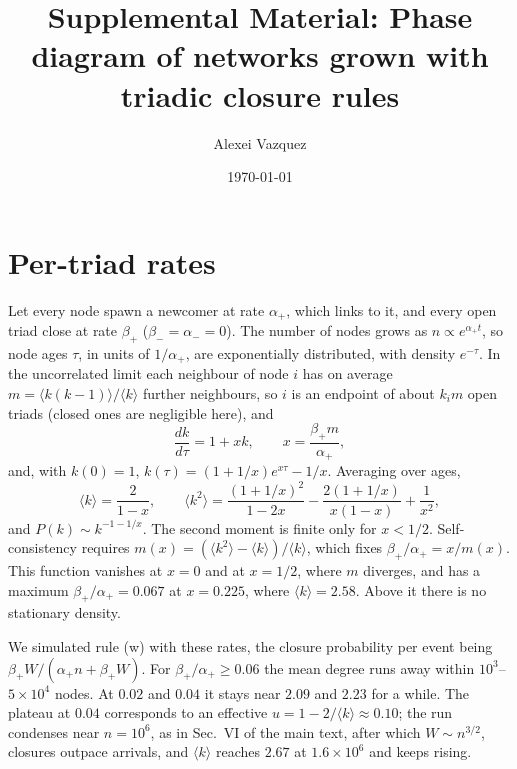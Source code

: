 \documentclass[aps,pre,twocolumn,superscriptaddress,floatfix,nofootinbib]{revtex4-2}
\begin{document}
\title{Supplemental Material: Phase diagram of networks grown with triadic closure rules}

\author{Alexei Vazquez}

\date{\today}

\maketitle

\section{Per-triad rates}

Let every node spawn a newcomer at rate $\alpha_+$, which links to it, and every
open triad close at rate $\beta_+$ ($\beta_-=\alpha_-=0$). The number of nodes
grows as $n\propto e^{\alpha_+t}$, so node ages $\tau$, in units of
$1/\alpha_+$, are exponentially distributed, with density $e^{-\tau}$. In the
uncorrelated limit each neighbour of node $i$ has on average
$m=\langle k(k-1)\rangle/\langle k\rangle$ further neighbours, so $i$ is an
endpoint of about $k_im$ open triads (closed ones are negligible here), and
\begin{equation}
  \frac{dk}{d\tau}=1+xk,\qquad x=\frac{\beta_+m}{\alpha_+},
\end{equation}
and, with $k(0)=1$, $k(\tau)=(1+1/x)e^{x\tau}-1/x$. Averaging over ages,
\begin{equation}
  \langle k\rangle=\frac{2}{1-x},\qquad
  \langle k^2\rangle=\frac{(1+1/x)^2}{1-2x}-\frac{2(1+1/x)}{x(1-x)}+\frac1{x^2},
\end{equation}
and $P(k)\sim k^{-1-1/x}$. The second moment is finite only for $x<1/2$.
Self-consistency requires $m(x)=(\langle k^2\rangle-\langle k\rangle)/\langle k\rangle$,
which fixes $\beta_+/\alpha_+=x/m(x)$. This function vanishes at $x=0$ and at
$x=1/2$, where $m$ diverges, and has a maximum $\beta_+/\alpha_+=0.067$ at
$x=0.225$, where $\langle k\rangle=2.58$. Above it there is no stationary
density.

We simulated rule (w) with these rates, the closure probability per event
being $\beta_+W/(\alpha_+n+\beta_+W)$. For $\beta_+/\alpha_+\ge0.06$ the mean
degree runs away within $10^3$--$5\times10^4$ nodes. At $0.02$ and $0.04$ it
stays near $2.09$ and $2.23$ for a while. The plateau at $0.04$ corresponds to
an effective $u=1-2/\langle k\rangle\approx0.10$; the run condenses near
$n=10^6$, as in Sec.~VI of the main text, after which $W\sim n^{3/2}$, closures
outpace arrivals, and $\langle k\rangle$ reaches $2.67$ at $1.6\times10^6$ and
keeps rising.
\end{document}
